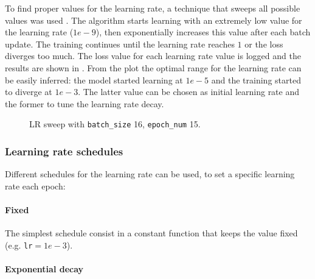 To find proper values for the learning rate, a technique that sweeps all
possible values was used \cite{PYISlearningsweep}.
The algorithm starts learning with an extremely low value for the learning rate
($1e-9$), then exponentially increases this value after each batch update. The
training continues until the learning rate reaches $1$ or the loss diverges too
much.
The loss value for each learning rate value is logged and the results are shown
in .
From the plot the optimal range for the learning rate can be easily inferred:
the model started learning at $1e-5$ and the training started to diverge at
$1e-3$. The latter value can be chosen as initial learning rate and the former
to tune the learning rate decay.

\begin{figure}[t!]
    \centering
    \caption{LR sweep with \texttt{batch\_size} 16, \texttt{epoch\_num} 15.}%
    \label{fig:LR_sweep_bs16_en15}
\end{figure}

\subsubsection{Learning rate schedules}

Different schedules for the learning rate can be used, to set a specific learning rate each epoch:

\paragraph{Fixed}

The simplest schedule consist in a constant function that keeps the value fixed
(e.g. \texttt{lr}$=1e-3$).

\paragraph{Exponential decay}

